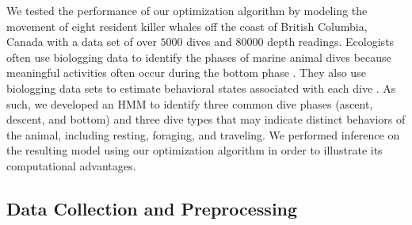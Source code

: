 
We tested the performance of our optimization algorithm by modeling the movement of eight resident killer whales off the coast of British Columbia, Canada with a data set of over $5000$ dives and $80000$ depth readings. Ecologists often use biologging data to identify the phases of marine animal dives because meaningful activities often occur during the bottom phase \citep[e.g. searching and hunting for prey,][]{Wright:2017,Jensen:2023}. They also use biologging data sets to estimate behavioral states associated with each dive \citep[e.g. foraging, resting, and travelling,][]{Tennessen:2023}. As such, we developed an HMM to identify three common dive phases (ascent, descent, and bottom) and three dive types that may indicate distinct behaviors of the animal, including resting, foraging, and traveling. We performed inference on the resulting model using our optimization algorithm in order to illustrate its computational advantages.

\subsection{Data Collection and Preprocessing}

